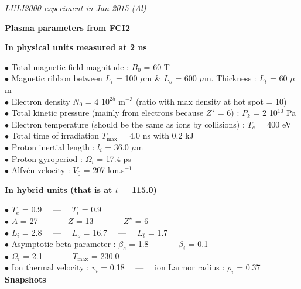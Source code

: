 \documentclass{report}
\begin{document}
{\it
LULI2000 experiment in Jan 2015 (Al)}

\bigskip

\begin{center}
{\large
\bf
Plasma parameters from FCI2\\[0.2cm]
}
{\it }
\end{center}

\bigskip

{\bf In physical units measured at 2 ns}

\smallskip

$\bullet$ Total magnetic field magnitude : $B_0$ = 60 T \\
$\bullet$ Magnetic ribbon between $L_i$ = 100 $\mu$m \& $L_o$ = 600 $\mu$m. Thickness : $L_t$ = 60 $\mu$m \\
$\bullet$ Electron density $N_0$ = 4 $10^{25}$ m$^{-3}$ (ratio with max density at hot spot = 10) \\
$\bullet$ Total kinetic pressure (mainly from electrons because $Z^{\star}$ = 6) : $P_k$ = 2 10$^{10}$ Pa \\
$\bullet$ Electron temperature (should be the same as ions by collisions) : $T_e$ = 400 eV \\
$\bullet$ Total time of irradiation $T_{\max}$ = 4.0 ns with 0.2 kJ \\
$\bullet$ Proton inertial length : $l_i$ = 36.0 $\mu$m \\
$\bullet$ Proton gyroperiod : $\Omega_i$ = 17.4 ps \\
$\bullet$ Alfvén velocity : $V_0$ = 207 km.s$^{-1}$ \\

\medskip

{\bf In hybrid units (that is at $t$ = 115.0)}

\smallskip

$\bullet$ $T_e$ = 0.9 \ \ --- \ \ $T_i$ = 0.9 \\
$\bullet$ $A$ = 27 \ \ --- \ \ $Z$ = 13 \ \ --- \ \ $Z^{\star}$ = 6 \\
$\bullet$ $L_i$ = 2.8 \ \ --- \ \ $L_o$ = 16.7 \ \ --- \ \ $L_t$ = 1.7 \\
$\bullet$ Asymptotic beta parameter : $\beta_e$ = 1.8 \ \ --- \ \ $\beta_i$ = 0.1 \\
$\bullet$ $\Omega_i$ = 2.1 \ \ --- \ \ $T_{\max}$ = 230.0 \\
$\bullet$ Ion thermal velocity : $v_i$ = 0.18 \ \ --- \ \ ion Larmor radius : $\rho_i$ = 0.37 \\

{\bf Snapshots}
\end{document}
